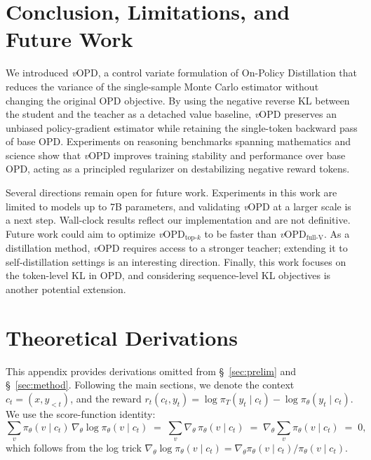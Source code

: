 \documentclass{article}
\newcommand{\method}{\emph{v}OPD}
\begin{document}
\section{Conclusion, Limitations, and Future Work}
\label{sec:conclusion}
We introduced \method{}, a control variate formulation of On-Policy Distillation that reduces the variance of the single-sample Monte Carlo estimator without changing the original OPD objective. By using the negative reverse KL between the student and the teacher as a detached value baseline, \method{} preserves an unbiased policy-gradient estimator while retaining the single-token backward pass of base OPD. Experiments on reasoning benchmarks spanning mathematics and science show that \method{} improves training stability and performance over base OPD, acting as a principled regularizer on destabilizing negative reward tokens.

Several directions remain open for future work. Experiments in this work are limited to models up to 7B parameters, and validating \method{} at a larger scale is a next step. Wall-clock results reflect our implementation and are not definitive. Future work could aim to optimize \method{}$_\text{top-$k$}$ to be faster than \method{}$_\text{full-V}$. As a distillation method, \method{} requires access to a stronger teacher; extending it to self-distillation settings is an interesting direction. Finally, this work focuses on the token-level KL in OPD, and considering sequence-level KL objectives is another potential extension.

\newpage


\newpage
\appendix

\section{Theoretical Derivations}
\label{app:theory}

This appendix provides derivations omitted from \S~\ref{sec:prelim} and \S~\ref{sec:method}. Following the main sections, we denote the context $c_t=(x,y_{<t})$, and the reward $r_t(c_t,y_t) = \log\pi_T(y_t\mid c_t) - \log\pi_\theta(y_t\mid c_t)$. We use the score-function identity:
\begin{equation}
\label{eq:app-score}
\sum_{v} \pi_\theta(v\mid c_t)\,\nabla_\theta\log\pi_\theta(v\mid c_t)
\;=\; \sum_{v} \nabla_\theta\,\pi_\theta(v\mid c_t)
\;=\; \nabla_\theta \sum_{v} \pi_\theta(v\mid c_t)
\;=\; 0,
\end{equation}
which follows from the log trick $\nabla_\theta\log\pi_\theta(v\mid c_t) = \nabla_\theta\pi_\theta(v\mid c_t)/\pi_\theta(v\mid c_t)$.
\end{document}
